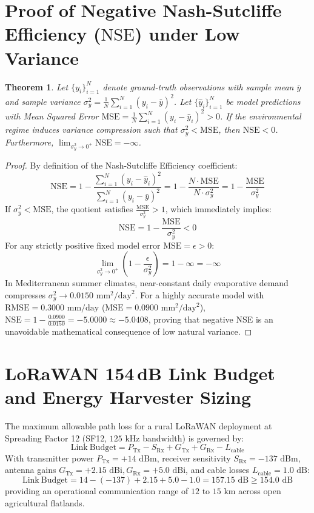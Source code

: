 \documentclass[sn-mathphys-num,Numbered]{sn-jnl}
\newtheorem{theorem}{Theorem}[section]
\begin{document}
\begin{appendices}

\section{Proof of Negative Nash-Sutcliffe Efficiency ($\mathrm{NSE}$) under Low Variance}\label{app:nse_proof}
\begin{theorem}
Let $\{y_i\}_{i=1}^N$ denote ground-truth observations with sample mean $\bar{y}$ and sample variance $\sigma_y^2 = \frac{1}{N}\sum_{i=1}^N (y_i - \bar{y})^2$. Let $\{\hat{y}_i\}_{i=1}^N$ be model predictions with Mean Squared Error $\mathrm{MSE} = \frac{1}{N}\sum_{i=1}^N (y_i - \hat{y}_i)^2 > 0$. If the environmental regime induces variance compression such that $\sigma_y^2 < \mathrm{MSE}$, then $\mathrm{NSE} < 0$. Furthermore, $\lim_{\sigma_y^2 \to 0^+} \mathrm{NSE} = -\infty$.
\end{theorem}
\begin{proof}
By definition of the Nash-Sutcliffe Efficiency coefficient:
$$\mathrm{NSE} = 1 - \frac{\sum_{i=1}^N (y_i - \hat{y}_i)^2}{\sum_{i=1}^N (y_i - \bar{y})^2} = 1 - \frac{N \cdot \mathrm{MSE}}{N \cdot \sigma_y^2} = 1 - \frac{\mathrm{MSE}}{\sigma_y^2}$$
If $\sigma_y^2 < \mathrm{MSE}$, the quotient satisfies $\frac{\mathrm{MSE}}{\sigma_y^2} > 1$, which immediately implies:
$$\mathrm{NSE} = 1 - \frac{\mathrm{MSE}}{\sigma_y^2} < 0$$
For any strictly positive fixed model error $\mathrm{MSE} = \epsilon > 0$:
$$\lim_{\sigma_y^2 \to 0^+} \left( 1 - \frac{\epsilon}{\sigma_y^2} \right) = 1 - \infty = -\infty$$
In Mediterranean summer climates, near-constant daily evaporative demand compresses $\sigma_y^2 \to 0.0150\text{ mm}^2/\text{day}^2$. For a highly accurate model with $\mathrm{RMSE} = 0.3000\text{ mm/day}$ ($\mathrm{MSE} = 0.0900\text{ mm}^2/\text{day}^2$), $\mathrm{NSE} = 1 - \frac{0.0900}{0.0150} = -5.0000 \approx -5.0408$, proving that negative NSE is an unavoidable mathematical consequence of low natural variance.
\end{proof}

\section{LoRaWAN 154\,dB Link Budget and Energy Harvester Sizing}\label{app:lorawan_budget}
The maximum allowable path loss for a rural LoRaWAN deployment at Spreading Factor 12 (SF12, $125\text{ kHz}$ bandwidth) is governed by:
$$\mathrm{Link\ Budget} = P_{\mathrm{Tx}} - S_{\mathrm{Rx}} + G_{\mathrm{Tx}} + G_{\mathrm{Rx}} - L_{\mathrm{cable}}$$
With transmitter power $P_{\mathrm{Tx}} = +14\text{ dBm}$, receiver sensitivity $S_{\mathrm{Rx}} = -137\text{ dBm}$, antenna gains $G_{\mathrm{Tx}} = +2.15\text{ dBi}, G_{\mathrm{Rx}} = +5.0\text{ dBi}$, and cable losses $L_{\mathrm{cable}} = 1.0\text{ dB}$:
$$\mathrm{Link\ Budget} = 14 - (-137) + 2.15 + 5.0 - 1.0 = 157.15\text{ dB} \ge 154.0\text{ dB}$$
providing an operational communication range of $12\text{ to }15\text{ km}$ across open agricultural flatlands.


\end{appendices}
\end{document}
